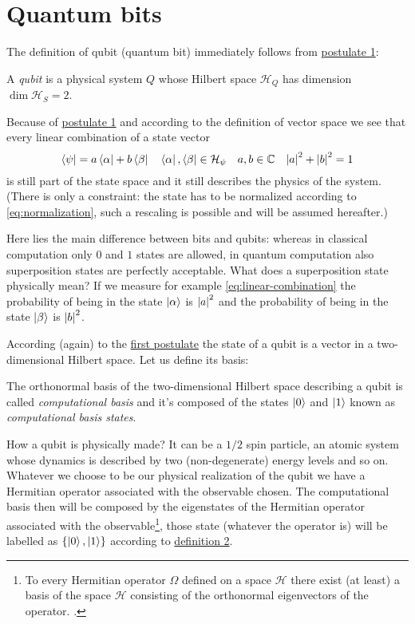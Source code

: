 \section{Quantum bits}
The definition of qubit (quantum bit) immediately follows from \hyperref[postulate:1]{postulate 1}:
\begin{defn}
A \emph{qubit} is a physical system $Q$ whose Hilbert space $\mathcal{H}_Q$ has dimension $\dim\mathcal{H}_S = 2$.
\end{defn}
Because of \hyperref[postulate:1]{postulate 1} and according to the definition of vector space we see that every linear combination of a state vector
\begin{equation}\label{eq:linear-combination}
    \bra{\psi} = a \bra{\alpha} + b \bra{\beta} \quad \bra{\alpha},\bra{\beta} \in \mathcal{H}_\psi \quad a,b \in \mathbb{C} \quad \abs*{a}^2 + \abs*{b}^2 = 1
\end{equation}
is still part of the state space and it still describes the physics of the system. (There is only a constraint: the state has to be normalized according to \eqref{eq:normalization}, such a rescaling is possible and will be assumed hereafter.) 


Here lies the main difference between bits and qubits: whereas in classical computation only $0$ and $1$ states are allowed, in quantum computation also superposition states are perfectly acceptable.  What does a superposition state physically mean? If we measure for example \eqref{eq:linear-combination} the probability of being in the state $\ket{\alpha}$ is  $\abs*{a}^2$ and the probability of being in the state $\ket{\beta}$ is $\abs*{b}^2$.

According (again) to the \hyperref[postulate:1]{first postulate} the state of a qubit is a vector in a two-dimensional Hilbert space. Let us define its basis:
\begin{defn}\label{def:computational-basis}
The orthonormal basis of the two-dimensional Hilbert space describing a qubit is called \emph{computational basis} and it's composed of the states $\ket{0}$ and $\ket{1}$ known as \emph{computational basis states}.
\end{defn}
How a qubit is physically made?
It can be a $1/2$ spin particle, an atomic system whose dynamics is described by two (non-degenerate) energy levels and so on.
Whatever we choose to be our physical realization of the qubit we have a Hermitian operator associated with the observable chosen. The computational basis then will be composed by the eigenstates of the Hermitian operator associated with the observable\footnote{To every Hermitian operator $\Omega$ defined on a space $\mathcal{H}$ there exist (at least) a basis of the space $\mathcal{H}$ consisting of the orthonormal eigenvectors of the operator. \cite[p.36]{Shankar}.}, those state (whatever the operator is) will be labelled as $\{\ket{0},\ket{1}\}$ according to \hyperref[def:computational-basis]{definition 2}.


